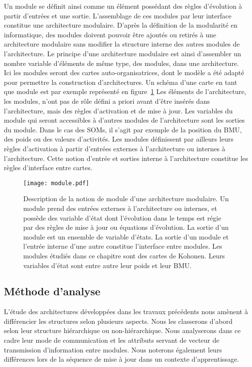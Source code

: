 \documentclass[../main]{subfiles}
\begin{document}
Un module se définit ainsi comme un élément possédant des règles d'évolution à partir d'entrées et une sortie. L'assemblage de ces modules par leur interface constitue une architecture modulaire. D'après la définition de la modularité en informatique, des modules doivent pouvoir être ajoutés ou retirés à une architecture modulaire sans modifier la structure interne des autres modules de l'architecture.
Le principe d'une architecture modulaire est ainsi d'assembler un nombre variable d'éléments de même type, des modules, dans une architecture. Ici les modules seront des cartes auto-organisatrices, dont le modèle a été adapté pour permettre la construction d'architectures. Un schéma d'une carte en tant que module est par exemple représenté en figure~\ref{fig:module}
Les éléments de l'architecture, les modules, n'ont pas de rôle défini a priori avant d'être insérés dans l'architecture, mais des règles d'activation et de mise à jour.
Les variables du module qui seront accessibles à d'autres modules de l'architecture sont les sorties du module. Dans le cas des SOMs, il s'agit par exemple de la position du BMU, des poids ou des valeurs d'activités.
Les modules définissent par ailleurs leurs règles d'activation à partir d'entrées externes à l'architecture ou internes à l'architecture.
Cette notion d'entrée et sorties interne à l'architecture constitue les règles d'interface entre cartes.



\begin{figure}
    \centering
    \texttt{[image: module.pdf]}
    \caption{Description de la notion de module d'une architecture modulaire. Un module prend des entrées externes à l'architecture ou internes, et possède des variable d'état dont l'évolution dans le temps est régie par des règles de mise à jour ou équations d'évolution. La sortie d'un module est un ensemble de variable d'états. La sortie d'un module et l'entrée interne d'une autre constitue l'interface entre modules. Les modules étudiés dans ce chapitre sont des cartes de Kohonen. Leurs variables d'état sont entre autre leur poids et leur BMU.\label{fig:module}}
\end{figure}

\subsection{Méthode d'analyse}

L'étude des architectures développées dans les travaux précédents nous amènent à différencier les structures selon plusieurs aspects. Nous les classerons d'abord selon leur structure hiérarchique ou non-hiérarchique.
Nous analyserons dans ce cadre leur mode de communication et les attributs servant de vecteur de transmission d'information entre modules. Nous noterons également leurs différences lors de la séquence de mise à jour dans un contexte d'apprentissage.
\end{document}
